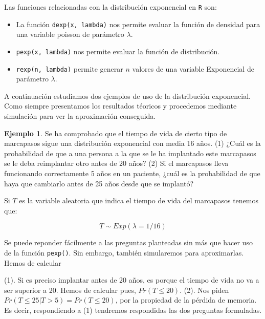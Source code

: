 \documentclass[
]{book}
\providecommand{\tightlist}{%
  \setlength{\itemsep}{0pt}\setlength{\parskip}{0pt}}
\newenvironment{whitebox}{
  \definecolor{shadecolor}{rgb}{255, 255, 255}  
  \color{black}
  \begin{shaded}}
 {\end{shaded}}
\theoremstyle{definition}
\theoremstyle{definition}
\newtheorem{example}{Ejemplo}[chapter]
\theoremstyle{definition}
\theoremstyle{definition}
\theoremstyle{remark}
\begin{document}
Las funciones relacionadas con la distribución exponencial en \texttt{R} son:

\begin{whitebox}

\begin{itemize}
\tightlist
\item
  La función \texttt{dexp(x,\ lambda)} nos permite evaluar la función de densidad para una variable poisson de parámetro \(\lambda\).
\item
  \texttt{pexp(x,\ lambda)} nos permite evaluar la función de distribución.
\item
  \texttt{rexp(n,\ lambda)} permite generar \(n\) valores de una variable Exponencial de parámetro \(\lambda\).
\end{itemize}

\end{whitebox}

A continuación estudiamos dos ejemplos de uso de la distribución exponencial. Como siempre presentamos los resultados téoricos y procedemos mediante simulación para ver la aproximación conseguida.

\begin{example}
\protect\hypertarget{exm:exponencial01}{}\label{exm:exponencial01}Se ha comprobado que el tiempo de vida de cierto tipo de marcapasos sigue una distribución exponencial con media 16 años. (1) ¿Cuál es la probabilidad de que a una persona a la que se le ha implantado este marcapasos se le deba reimplantar otro antes de 20 años? (2) Si el marcapasos lleva funcionando correctamente 5 años en un paciente, ¿cuál es la probabilidad de que haya que cambiarlo antes de 25 años desde que se implantó?
\end{example}

Si \(T\) es la variable aleatoria que indica el tiempo de vida del marcapasos tenemos que:

\[T \sim Exp(\lambda = 1/16)\]

Se puede reponder fácilmente a las preguntas planteadas sin más que hacer uso de la función \texttt{pexp()}. Sin embargo, también simularemos para aproximarlas. Hemos de calcular

(1). Si es preciso implantar antes de 20 años, es porque el tiempo de vida no va a ser superior a 20. Hemos de calcular pues, \(Pr(T \leq 20)\). (2). Nos piden \(Pr(T \leq 25|T>5)=Pr(T\leq 20)\), por la propiedad de la pérdida de memoria. Es decir, respondiendo a (1) tendremos respondidas las dos preguntas formuladas.
\end{document}

